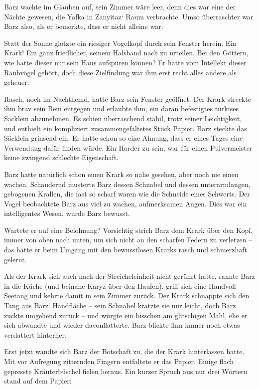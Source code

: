 Barz wachte im Glauben auf, sein Zimmer wäre leer, denn dies war eine der Nächte gewesen, die Yafka in Zanyitaz‘ Raum verbrachte. Umso überraschter war Barz also, als er bemerkte, dass er nicht alleine war.

Statt der Sonne glotzte ein riesiger Vogelkopf durch sein Fenster herein. Ein Krark! Ein ganz friedlicher, seinem Halsband nach zu urteilen. Bei den Göttern, wie hatte dieser nur sein Haus aufspüren können? Er hatte vom Intellekt dieser Raubvögel gehört, doch diese Zielfindung war ihm erst recht alles andere als geheuer.

Rasch, noch im Nachthemd, hatte Barz sein Fenster geöffnet. Der Krark streckte ihm brav sein Bein entgegen und erlaubte ihm, ein daran befestigtes türkises Säcklein abzunehmen. Es schien überraschend stabil, trotz seiner Leichtigkeit, und enthielt ein kompliziert zusammengefaltetes Stück Papier. Barz steckte das Säcklein grinsend ein. Er hatte schon so eine Ahnung, dass er eines Tages eine Verwendung dafür finden würde. Ein Horder zu sein, war für einen Pulvermeister keine zwingend schlechte Eigenschaft.

Barz hatte natürlich schon einen Krark so nahe gesehen, aber noch nie einen wachen. Schaudernd musterte Barz dessen Schnabel und dessen unterarmlangen, gebogenen Krallen, die fast so scharf waren wie die Schneide eines Schwerts. Der Vogel beobachtete Barz aus viel zu wachen, aufmerksamen Augen. Dies war ein intelligentes Wesen, wurde Barz bewusst.

Wartete er auf eine Belohnung? Vorsichtig strich Barz dem Krark über den Kopf, immer von oben nach unten, um sich nicht an den scharfen Federn zu verletzen – das hatte er beim Umgang mit den bewusstlosen Krarks rasch und schmerzhaft gelernt.

Als der Krark sich auch nach der Streicheleinheit nicht gerührt hatte, rannte Barz in die Küche (und beinahe Karyz über den Haufen), griff sich eine Handvoll Seetang und kehrte damit in sein Zimmer zurück. Der Krark schnappte sich den Tang aus Barz‘ Handfläche – sein Schnabel kratzte sie nur leicht, doch Barz zuckte umgehend zurück – und würgte ein bisschen am glitschigen Mahl, ehe er sich abwandte und wieder davonflatterte. Barz blickte ihm immer noch etwas verdattert hinterher.

Erst jetzt wandte sich Barz der Botschaft zu, die der Krark hinterlassen hatte. Mit vor Aufregung zitternden Fingern entfaltete er das Papier. Einige flach gepresste Kräuterbüschel fielen heraus. Ein kurzer Spruch aus nur drei Wörtern stand auf dem Papier:

